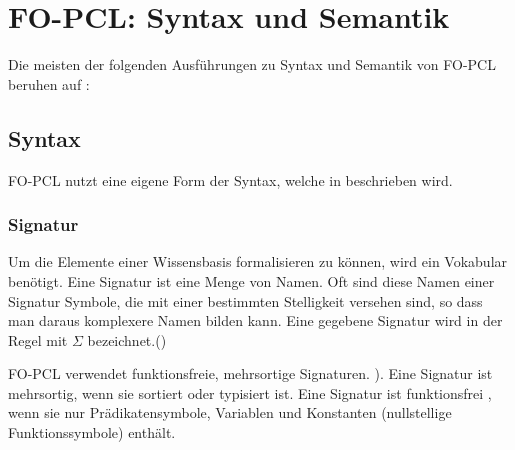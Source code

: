 \documentclass[a4paper, 11pt]{book}
\begin{document}
\section{FO-PCL: Syntax und Semantik}
Die meisten der folgenden Ausführungen zu Syntax und Semantik von FO-PCL beruhen auf \cite[Kap. 6.1, 6.2]{Fis10}:

\subsection{Syntax}\label{sec: Syntax}

FO-PCL nutzt eine eigene Form der Syntax, welche in \cite[Kap. 6.1]{Fis10} beschrieben wird.

\subsubsection{Signatur}
\label{Signatur}
Um die Elemente einer Wissensbasis formalisieren zu können, wird ein Vokabular benötigt. Eine Signatur ist eine Menge von Namen. Oft sind diese Namen einer Signatur Symbole, die mit einer bestimmten Stelligkeit versehen sind, so dass man daraus komplexere Namen bilden kann.  
Eine gegebene Signatur  wird in der Regel mit $ \Sigma $  bezeichnet.(\cite[Kap. 3.2, S. 29]{BKI08})

FO-PCL verwendet funktionsfreie, mehrsortige Signaturen. \cite[Kap. 6.2, S. 124]{Fis10}).
Eine Signatur ist mehrsortig, wenn sie sortiert oder typisiert ist.
Eine Signatur ist funktionsfrei , wenn sie nur Prädikatensymbole, Variablen und Konstanten (nullstellige Funktionssymbole) enthält.
\end{document}
